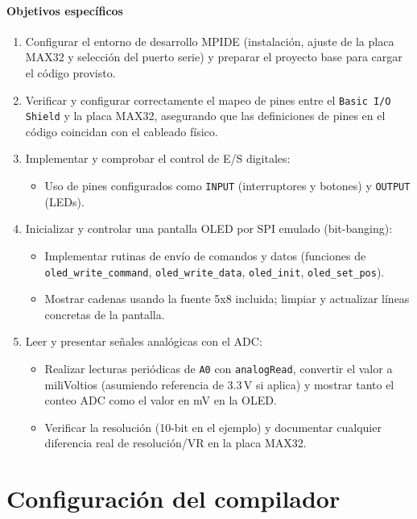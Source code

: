 \documentclass[a4paper,12pt]{article}
\begin{document}
\paragraph{Objetivos específicos}
\begin{enumerate}
  \item Configurar el entorno de desarrollo MPIDE (instalación, ajuste de la placa MAX32 y selección del puerto serie) y preparar el proyecto base para cargar el código provisto.
  \item Verificar y configurar correctamente el mapeo de pines entre el \texttt{Basic I/O Shield} y la placa MAX32, asegurando que las definiciones de pines en el código coincidan con el cableado físico.
  \item Implementar y comprobar el control de E/S digitales:
    \begin{itemize}
      \item Uso de pines configurados como \texttt{INPUT} (interruptores y botones) y \texttt{OUTPUT} (LEDs).
    \end{itemize}
  \item Inicializar y controlar una pantalla OLED por SPI emulado (bit-banging):
    \begin{itemize}
      \item Implementar rutinas de envío de comandos y datos (funciones de \texttt{oled\_write\_command}, \texttt{oled\_write\_data}, \texttt{oled\_init}, \texttt{oled\_set\_pos}).
      \item Mostrar cadenas usando la fuente 5x8 incluida; limpiar y actualizar líneas concretas de la pantalla.
    \end{itemize}
  \item Leer y presentar señales analógicas con el ADC:
    \begin{itemize}
      \item Realizar lecturas periódicas de \texttt{A0} con \texttt{analogRead}, convertir el valor a miliVoltios (asumiendo referencia de 3.3\,V si aplica) y mostrar tanto el conteo ADC como el valor en mV en la OLED.
      \item Verificar la resolución (10-bit en el ejemplo) y documentar cualquier diferencia real de resolución/VR en la placa MAX32.
    \end{itemize}
\end{enumerate}

\section{Configuración del compilador}
\end{document}
